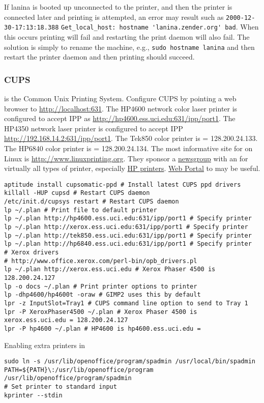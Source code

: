 \documentclass[12pt,twoside]{article}
\begin{document}
If lanina is booted up unconnected to the printer, and then the 
printer is connected later and printing is attempted, an error may
result such as 
\verb'2000-12-30-17:13:18.388'
\verb+Get_local_host: hostname 'lanina.zender.org' bad+.
When this occurs printing will fail and restarting the print daemon
will also fail.
The solution is simply to rename the machine, e.g.,
\verb'sudo hostname lanina' and then restart the printer daemon 
and then printing should succeed.

\subsubsection{CUPS}\label{sxn:cups}
 is the Common Unix Printing System.
Configure CUPS by pointing a web browser to \url{http://localhost:631}.
The HP4600 network color laser printer is configured to accept IPP
as \url{http://hp4600.ess.uci.edu:631/ipp/port1}.
The HP4350 network laser printer is configured to accept IPP
\url{http://192.168.14.2:631/ipp/port1}.
The Tek850 color printer is  = 128.200.24.133.
The HP6840 color printer is  = 128.200.24.134.
The most informative site for  on Linux is 
\url{http://www.linuxprinting.org}.
They sponsor a \href{linuxprinting.hp.general}{newsgroup} with 
an  for virtually all types of printer,
especially \href{hp-list@linuxprinting.org}{HP printers}.
\href{http://www.linuxprinting.org/newsportal/thread.php3?name=linuxprinting.hp.general}{Web Portal}
to  may be useful.
\begin{verbatim}
aptitude install cupsomatic-ppd # Install latest CUPS ppd drivers
killall -HUP cupsd # Restart CUPS daemon
/etc/init.d/cupsys restart # Restart CUPS daemon
lp ~/.plan # Print file to default printer
lp ~/.plan http://hp4600.ess.uci.edu:631/ipp/port1 # Specify printer
lp ~/.plan http://xerox.ess.uci.edu:631/ipp/port1 # Specify printer
lp ~/.plan http://tek850.ess.uci.edu:631/ipp/port1 # Specify printer
lp ~/.plan http://hp6840.ess.uci.edu:631/ipp/port1 # Specify printer
# Xerox drivers
# http://www.office.xerox.com/perl-bin/opb_drivers.pl
lp ~/.plan http://xerox.ess.uci.edu # Xerox Phaser 4500 is 128.200.24.127 
lp -o docs ~/.plan # Print printer options to printer
lp -dhp4600/hp4600t -oraw # GIMP2 uses this by default
lpr -z InputSlot=Tray1 # CUPS command line option to send to Tray 1
lpr -P XeroxPhaser4500 ~/.plan # Xerox Phaser 4500 is xerox.ess.uci.edu = 128.200.24.127 
lpr -P hp4600 ~/.plan # HP4600 is hp4600.ess.uci.edu = 
\end{verbatim}
Enabling extra printers in 
\begin{verbatim}
sudo ln -s /usr/lib/openoffice/program/spadmin /usr/local/bin/spadmin
PATH=${PATH}\:/usr/lib/openoffice/program
/usr/lib/openoffice/program/spadmin
# Set printer to standard input
kprinter --stdin
\end{verbatim}
\end{document}
